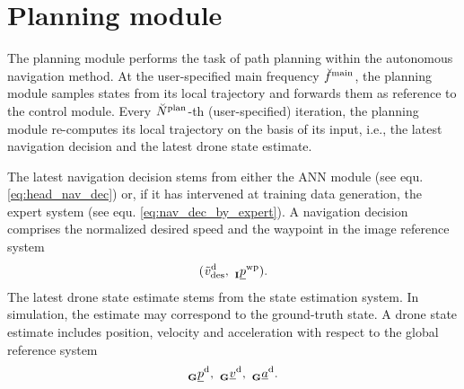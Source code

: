 \section{Planning module}
The planning module performs the task of path planning
within the autonomous navigation method.
At the user-specified main frequency 
$\freq[\user]{\main}{}{}{}$,
the planning module 
samples states from its local trajectory
and forwards them as reference to the control module.
Every $\num[\user]{\text{plan}}{}{}{}$-th (user-specified) iteration,
the planning module re-computes its local trajectory
on the basis of its input,
i.e., the latest navigation decision and the latest drone state estimate. 

The latest navigation decision
stems from either the ANN module
(see equ. \ref{eq:head_nav_dec}) 
or, if it has intervened at training data generation,
the expert system (see equ. \ref{eq:nav_dec_by_expert}).
A navigation decision comprises the normalized desired speed 
and the waypoint in the image reference system
\begin{equation}
    (
        \speed[\norm]{\drone}{\desired}{}{}
        ,\ 
        \pos[]{\wayp}{}{\irs}{}
    ).
\end{equation}
The latest drone state estimate stems from the state estimation system.
In simulation, the estimate may correspond to the ground-truth state.
A drone state estimate includes position, velocity and acceleration
with respect to the global reference system
\begin{equation} \label{eq:drone_state}
    \pos[]{\drone}{}{\grs}{}
    ,\ 
    \vel[]{\drone}{}{\grs}{}
    ,\ 
    \acc[]{\drone}{}{\grs}{}.
\end{equation}


